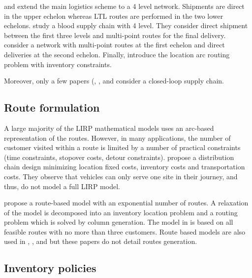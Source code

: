 \documentclass[a4paper,10pt]{article}
\begin{document}
\begin{linenumbers}
\cite{AmbScu05} and \cite{Tavana2018} extend the main logistics scheme to a 4 level network. Shipments are direct in the upper echelon whereas LTL routes are performed in the two lower echelons. 
\cite{Eskandari2018} study a blood supply chain with 4 level. They consider direct shipment between the first three levels and multi-point routes for the final delivery. 
\cite{Bashiri2018} consider a network with multi-point routes at the first echelon and direct deliveries at the second echelon. 
Finally, \cite{Riquelme2016} introduce the location arc routing problem with inventory constraints. 

Moreover, only a few papers (\cite{LiuChenLiLiu2015}, \cite{Deng2016}, \cite{Zhalechian2016} and \cite{LiGuoWangFu2013} 
consider a closed-loop supply chain. 


\subsection{Route formulation}
\label{sec:r}

A large majority of the LIRP mathematical models uses an arc-based representation of the routes. 
However, in many applications, the number of customer visited within a route is limited by a number of practical constraints (time constraints, stopover costs, detour constraints). \cite{MaDav05} propose a distribution chain design  minimizing location fixed costs, inventory costs and transportation costs. They observe that vehicles can only serve one site in their journey, and thus, do not model a full LIRP model. 

\cite{Guerrero2013} propose a route-based model with an exponential number of routes. A relaxation of the model is decomposed into an inventory location problem and a routing problem which is solved by column generation. 
The model in \cite{Lehrlaly2016} is based on all feasible routes with no more than three customers. 
Route based models are also used in \cite{LiGuoWangFu2013}, \cite{LiuChenLiLiu2015},  \cite{Deng2016} and \cite{hiassat_genetic_2017} 
but these papers do not detail routes generation.

\subsection{Inventory policies}
\label{sec:i}


\end{linenumbers}
\end{document}
